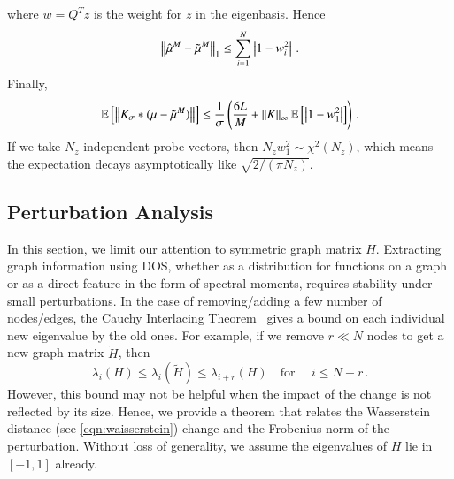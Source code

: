 where $w=Q^Tz$ is the weight for $z$ in the eigenbasis. Hence
\begin{equation}
	\left\lVert\hat{\mu}^M-\tilde{\mu}^M\right\rVert_1 \leq \sum_{i=1}^N \left\lvert1-w_i^2\right\rvert\,.
\end{equation}
Finally,
\begin{equation}
	\operatorname{\mathbb{E}}\left[\left\lVert K_\sigma\ast(\mu-\tilde{\mu}^M)\right\rVert\right]\leq \frac{1}
	{\sigma}\left(\frac{6L}{M}+\left\lVert K\right\rVert_\infty\operatorname{\mathbb{E}}\left[
	\left\lvert1-w_1^2\right\rvert\right]\right)\,.
\end{equation}
If we take $N_z$ independent probe vectors, then $N_zw_1^2\sim\chi^2(N_z)$,
which means the expectation decays asymptotically like $\sqrt{2 / (\pi N_z)}$.

\subsection{Perturbation Analysis}
In this section, we limit our attention to symmetric graph matrix $H$.
Extracting graph information using DOS, whether as a distribution for functions
on a graph or as a direct feature in the form of spectral moments, requires
stability under small perturbations. In the case of removing/adding a few 
number of nodes/edges, the Cauchy Interlacing Theorem~\cite{magnus1988matrix}
gives a bound on each individual new eigenvalue by the old ones. For example, 
if we remove $r\ll N$ nodes to get a new graph matrix $
\widetilde{H}$, then
\begin{equation}\label{eqn:interlacing}
	\lambda_i(H)\leq \lambda_i(\widetilde{H})\leq \lambda_{i+r}(H)\quad\text{for
	}\quad i\leq N-r\,.
\end{equation}
However, this bound may not be helpful when the impact of the change is not
reflected by its size. Hence, we provide a theorem that relates the Wasserstein
distance (see \cref{eqn:waisserstein}) change and the Frobenius norm of
the perturbation. Without loss of generality, we assume the eigenvalues of $H$
lie in $[-1,1]$ already.

